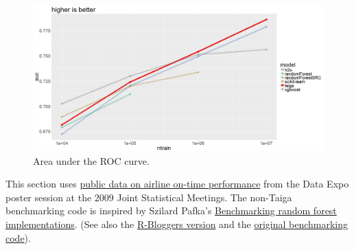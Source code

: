 \documentclass[10pt]{article}
\begin{document}
\begin{figure}[H]
\noindent \begin{centering}
\includegraphics[width=14cm]{ontime/auc.png}
\par\end{centering}
\protect\caption{\label{fig:ontime-auc}Area under the ROC curve.}
\end{figure}


This section uses 
\href{http://stat-computing.org/dataexpo/2009/}
{public data on airline on-time performance} 
from the Data Expo poster session at the
$2009$ Joint Statistical Meetings.
The non-Taiga benchmarking code is inspired by Szilard Pafka's
\href{http://datascience.la/benchmarking-random-forest-implementations/}
{Benchmarking random forest implementations}.
(See also the
\href{https://www.r-bloggers.com/benchmarking-random-forest-implementations/}
{R-Bloggers version}
and the \href{https://github.com/szilard/benchm-ml}
{original benchmarking code}).

\appendix



\end{document}
